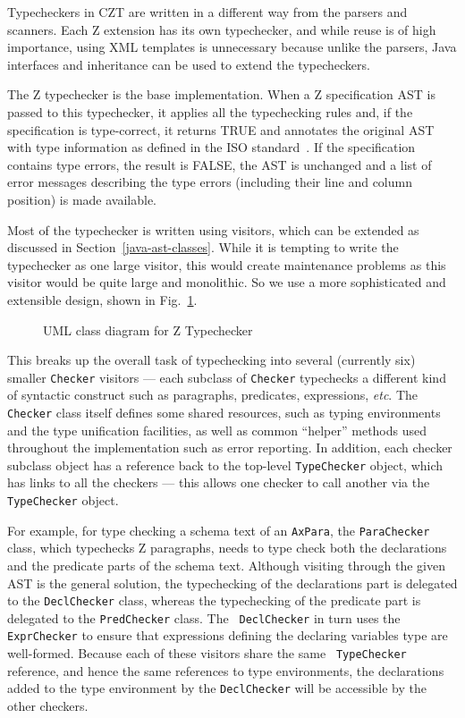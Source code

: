 \documentclass{llncs}
\begin{document}
Typecheckers in CZT are written in a different way from the parsers
and scanners. Each Z extension has its own typechecker, and while reuse
is of high importance, using XML templates is unnecessary because
unlike the parsers, Java interfaces and inheritance can be used to
extend the typecheckers.

The Z typechecker is the base implementation.  When a Z specification
AST is passed to this typechecker, it applies all the typechecking
rules and, if the specification is type-correct, it returns TRUE and
annotates the original AST with type information as defined in the ISO
standard~\cite[Section~10]{isoz}.  If the specification contains type errors,
the result is FALSE, the AST is unchanged and a list of error messages
describing the type errors (including their line and column position)
is made available.

Most of the typechecker is written using visitors, which can be
extended as discussed in Section~\ref{java-ast-classes}.  While it is
tempting to write the typechecker as one large visitor, this would
create maintenance problems as this visitor would be quite large and
monolithic.  So we use a more sophisticated and extensible design,
shown in Fig.~\ref{fig:ztypechecker}.

\def\epsfsize#1#2{0.50#1}
\begin{figure}[t]
\begin{center}
\caption{UML class diagram for Z Typechecker}\label{fig:ztypechecker}
\end{center}
\end{figure}
\def\epsfsize#1#2{\epsfxsize}

This breaks up the overall task of typechecking into several
(currently six) smaller \texttt{Checker} visitors --- each subclass of
\texttt{Checker} typechecks a different kind of syntactic construct such
as paragraphs, predicates, expressions, \textit{etc}.  The \texttt{Checker}
class itself defines some shared resources, such as typing
environments and the type unification facilities, as well as common
``helper'' methods used throughout the implementation such as error
reporting.  In addition, each checker subclass object has a reference
back to the top-level \texttt{TypeChecker} object, which has links to
all the checkers --- this allows one checker to call another via the
\texttt{TypeChecker} object.

For example, for type checking a schema text of an {\tt AxPara}, the
{\tt ParaChecker} class, which typechecks Z paragraphs, needs to type
check both the declarations and the predicate parts of the schema
text.  Although visiting through the given AST is the general
solution, the typechecking of the declarations part is delegated to
the {\tt DeclChecker} class, whereas the typechecking of the predicate
part is delegated to the {\tt PredChecker} class.  The {\tt
DeclChecker} in turn uses the {\tt ExprChecker} to ensure that
expressions defining the declaring variables type are
well-formed. Because each of these visitors share the same {\tt
TypeChecker} reference, and hence the same references to type
environments, the declarations added to the type environment by the
{\tt DeclChecker} will be accessible by the other checkers.
\end{document}

